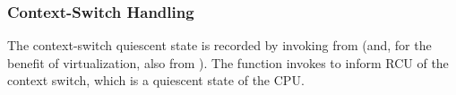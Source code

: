 
\subsubsection{Context-Switch Handling} \label{sec:context_switch}
The context-switch quiescent state is recorded by invoking
 from  (and, for the
benefit of virtualization, also from ).
%
The  function invokes 
to inform RCU of the context switch, which is a quiescent state of the CPU.

